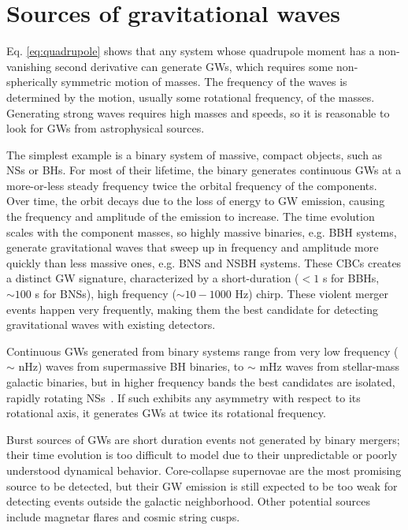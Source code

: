 \section{Sources of gravitational waves}\label{sec:gw-sources}

Eq. \ref{eq:quadrupole} shows that any system whose quadrupole moment has a non-vanishing second derivative can generate \acp{GW}, which requires some non-spherically symmetric motion of masses.
The frequency of the waves is determined by the motion, usually some rotational frequency, of the masses.
Generating strong waves requires high masses and speeds, so it is reasonable to look for \acp{GW} from astrophysical sources.

The simplest example is a binary system of massive, compact objects, such as \acp{NS} or \acp{BH}.
For most of their lifetime, the binary generates continuous \acp{GW} at a more-or-less steady frequency twice the orbital frequency of the components.
Over time, the orbit decays due to the loss of energy to \ac{GW} emission, causing the frequency and amplitude of the emission to increase.
The time evolution scales with the component masses, so highly massive binaries, e.g. \ac{BBH} systems, generate gravitational waves that sweep up in frequency and amplitude more quickly than less massive ones, e.g. \ac{BNS} and \ac{NSBH}  systems.
These \acp{CBC} creates a distinct \ac{GW} signature, characterized by a short-duration ($<1$ s for \acp{BBH}, $\sim100$ s for \acp{BNS}), high frequency ($\sim10-1000$ Hz) chirp.
These violent merger events happen very frequently, making them the best candidate for detecting gravitational waves with existing detectors.

Continuous \acp{GW} generated from binary systems range from very low frequency ($\sim$ nHz) waves from supermassive \ac{BH} binaries, to $\sim$ mHz waves from stellar-mass galactic binaries, but in higher frequency bands the best candidates are isolated, rapidly rotating \acp{NS}~\citep{Riles_2017}.
If such  exhibits any asymmetry with respect to its rotational axis, it generates \acp{GW} at twice its rotational frequency.

Burst sources of \acp{GW} are short duration events not generated by binary mergers; their time evolution is too difficult to model due to their unpredictable or poorly understood dynamical behavior.
Core-collapse supernovae are the most promising source to be detected, but their \ac{GW} emission is still expected to be too weak for detecting events outside the galactic neighborhood.
Other potential sources include magnetar flares and cosmic string cusps.

